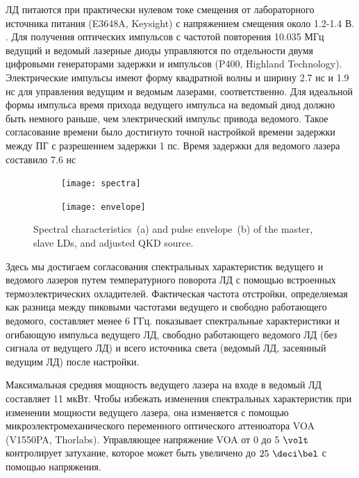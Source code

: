 ЛД питаются при практически нулевом токе смещения от лабораторного источника питания (E3648A, Keysight) с напряжением смещения около 1.2-1.4 В. . Для получения оптических импульсов с частотой повторения 10.035 МГц ведущий и ведомый лазерные диоды управляются по отдельности двумя цифровыми генераторами задержки и импульсов (P400, Highland Technology). Электрические импульсы имеют форму квадратной волны и ширину 2.7 нс и 1.9 нс  для управления ведущим и ведомым лазерами, соответственно. Для идеальной формы импульса время прихода ведущего импульса на ведомый диод должно быть немного раньше, чем электрический импульс привода ведомого. Такое согласование времени было достигнуто точной настройкой времени задержки между ПГ с разрешением задержки 1 пс. Время задержки для ведомого лазера составило 7.6 нс
\begin{figure}
\begin{subfigure}{0.49\linewidth}
	\centering
	\texttt{[image: spectra]}
	\caption{}
\end{subfigure}
\hfill
\begin{subfigure}{0.49\linewidth}
	\centering
	\texttt{[image: envelope]}
	\caption{}
\end{subfigure}
\caption{Spectral characteristics~(a) and pulse envelope~(b) of the master, slave LDs, and adjusted QKD source. }
\label{fig:QKD_source}
\end{figure}
Здесь мы достигаем согласования спектральных характеристик ведущего и ведомого лазеров путем температурного поворота ЛД с помощью встроенных термоэлектрических охладителей. Фактическая частота отстройки, определяемая как разница между пиковыми частотами ведущего и свободно работающего ведомого, составляет менее 6 ГГц.  показывает спектральные характеристики и огибающую импульса ведущего ЛД, свободно работающего ведомого ЛД (без сигнала от ведущего ЛД) и всего источника света (ведомый ЛД, засеянный ведущим ЛД) после настройки. 

Максимальная средняя мощность ведущего лазера на входе в ведомый ЛД составляет 11 мкВт. Чтобы избежать изменения спектральных характеристик при изменении мощности ведущего лазера, она изменяется с помощью микроэлектромеханического переменного оптического аттенюатора VOA (V1550PA, Thorlabs). Управляющее напряжение VOA от 0 до $5~\volt$ контролирует затухание, которое может быть увеличено до $25~\deci\bel$ с помощью напряжения. 

